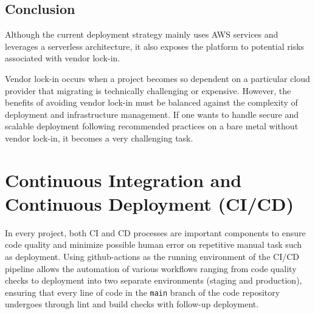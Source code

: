 \subsection{Conclusion}

Although the current deployment strategy mainly uses \ac{AWS} services and leverages a serverless architecture, it also exposes the platform to potential risks associated with vendor lock-in. 

Vendor lock-in occurs when a project becomes so dependent on a particular cloud provider that migrating is technically challenging or expensive.
However, the benefits of avoiding vendor lock-in must be balanced against the complexity of deployment and infrastructure management.
If one wants to handle secure and scalable deployment following recommended practices on a bare metal without vendor lock-in, it becomes a very challenging task.



\section{Continuous Integration and Continuous Deployment (CI/CD)}
\label{sec:cicd}
In every project, both \ac{CI} and \ac{CD} processes are important components to ensure code quality and minimize possible human error on repetitive manual task such as deployment.
Using \gls{github-actions} as the running environment of the \ac{CI}/\ac{CD} pipeline allows the automation of various workflows ranging from code quality checks to deployment into two separate environments (staging and production), ensuring that every line of code in the \texttt{main} branch of the code repository undergoes through lint and build checks with follow-up deployment.


